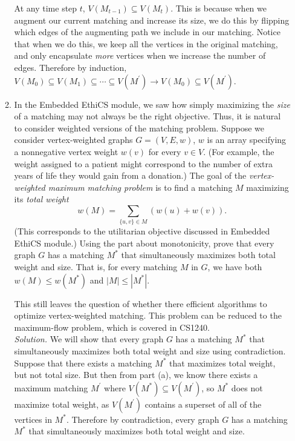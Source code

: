 \documentclass[11pt]{article}
\begin{document}
\begin{enumerate}
\begin{enumerate}
            At any time step $t$, $V\left(M_{t-1}\right) \subseteq V\left(M_t\right)$. This is because when we augment our current matching and increase its size, we do this by flipping which edges of the augmenting path we include in our matching. Notice that when we do this, we keep all the vertices in the original matching, and only encapsulate \emph{more} vertices when we increase the number of edges. Therefore by induction, $V\left(M_0\right) \subseteq V\left(M_1\right) \subseteq \cdots \subseteq V\left(M^\prime \right) \rightarrow V\left(M_0\right) \subseteq V\left(M^\prime \right)$. \\

        \item   In the Embedded EthiCS module, we saw how simply maximizing the {\em size} of a matching may not always be the right objective.  Thus, it is natural to consider weighted versions of the matching problem. Suppose 
        we consider vertex-weighted graphs $G = (V,E,w)$, $w$ is an array specifying a nonnegative vertex weight $w(v)$ for every $v\in V$.  (For example, the weight assigned to a patient might correspond to the number of extra years of life they would gain from a donation.)
          The goal of the {\em vertex-weighted maximum matching problem} is to find a matching $M$ maximizing its {\em total weight} $$w(M) = \sum_{\{u,v\}\in M} (w(u)+w(v)).$$
        (This corresponds to the utilitarian objective discussed in Embedded EthiCS module.)
        Using the part about monotonicity, prove that every graph $G$ has a matching $M^*$ that simultaneously maximizes both total weight and size.  That is, for every matching $M$ in $G$, we have
        both $w(M)\leq w(M^*)$ and $|M|\leq |M^*|$.

        This still leaves the question of whether there efficient algorithms to optimize vertex-weighted matching.  This problem can be reduced to the maximum-flow problem, which is covered in CS1240.\\

        \textit{Solution. } We will show that every graph $G$ has a matching $M^*$ that simultaneously maximizes both total weight and size using contradiction. Suppose that there exists a matching $M^*$ that maximizes total weight, but not total size. But then from part (a), we know there exists a maximum matching $M^{\prime}$ where $V(M^*) \subseteq V\left(M^{\prime}\right)$, so $M^*$ does not maximize total weight, as $V\left(M^{\prime}\right)$ contains a superset of all of the vertices in $M^*$. Therefore by contradiction, every graph $G$ has a matching $M^*$ that simultaneously maximizes both total weight and size.


\end{enumerate}
\end{enumerate}
\end{document}
